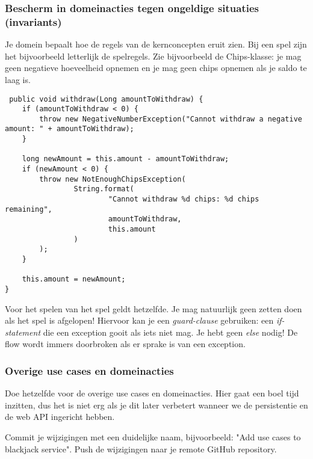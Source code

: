 \subsubsection{Bescherm in domeinacties tegen ongeldige situaties (invariants)}
Je domein bepaalt hoe de regels van de kernconcepten eruit zien.
Bij een spel zijn het bijvoorbeeld letterlijk de spelregels.
Zie bijvoorbeeld de Chips-klasse: je mag geen negatieve hoeveelheid opnemen 
en je mag geen chips opnemen als je saldo te laag is.

\begin{verbatim}
 public void withdraw(Long amountToWithdraw) {
    if (amountToWithdraw < 0) {
        throw new NegativeNumberException("Cannot withdraw a negative amount: " + amountToWithdraw);
    }

    long newAmount = this.amount - amountToWithdraw;
    if (newAmount < 0) {
        throw new NotEnoughChipsException(
                String.format(
                        "Cannot withdraw %d chips: %d chips remaining",
                        amountToWithdraw,
                        this.amount
                )
        );
    }

    this.amount = newAmount;
}    
\end{verbatim}

Voor het spelen van het spel geldt hetzelfde. Je mag natuurlijk 
geen zetten doen als het spel is afgelopen! Hiervoor kan je een \textit{guard-clause} gebruiken:
een \textit{if-statement} die een exception gooit als iets niet mag. Je hebt geen \textit{else} nodig! 
De flow wordt immers doorbroken als er sprake is van een exception.

\subsubsection{Overige use cases en domeinacties}
Doe hetzelfde voor de overige use cases en domeinacties. 
Hier gaat een boel tijd inzitten, 
dus het is niet erg als je dit later verbetert wanneer we 
de persistentie en de web API ingericht hebben.

Commit je wijzigingen met een duidelijke naam, 
bijvoorbeeld: "Add use cases to blackjack service". 
Push de wijzigingen naar je remote GitHub repository.